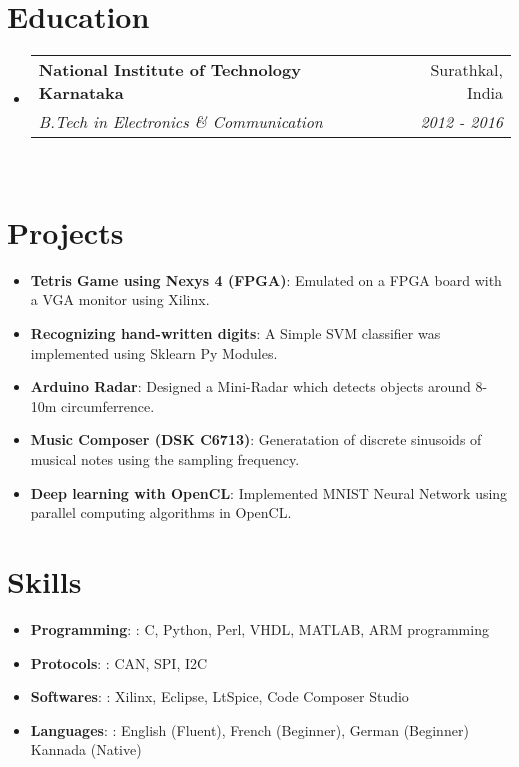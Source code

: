 \documentclass[letterpaper,11pt]{article}
\makeatletter
\newcommand{\resumeItem}[2]{
  \item\small{
    \textbf{#1}{: #2 \vspace{-2pt}}
  }
}
\newcommand{\resumeSubheading}[4]{
  \vspace{-1pt}\item
    \begin{tabular*}{0.97\textwidth}{l@{\extracolsep{\fill}}r}
      \textbf{#1} & #2 \\
      \textit{\small#3} & \textit{\small #4} \\
    \end{tabular*}\vspace{-5pt}
}
\newcommand{\resumeSubItem}[2]{\resumeItem{#1}{#2}\vspace{-4pt}}
\newcommand{\resumeSubHeadingListStart}{\begin{itemize}[leftmargin=*]}
\newcommand{\resumeSubHeadingListEnd}{\end{itemize}}
\makeatother
\begin{document}
\section{Education}
  \resumeSubHeadingListStart
    \resumeSubheading
      {National Institute of Technology Karnataka}{Surathkal, India}
      {B.Tech in Electronics \& Communication}{2012 - 2016}\\ \vspace{5pt}
    \iffalse
    \resumeSubheading
      {Vidya Mandir P.U College}{Bangalore, India}
      {12th, PCMB}{2010 - 2012}
	\resumeSubheading
	  {M.E.S. Kishore Kendra}{Bangalore, India}
	  {10$^{th}$, High School}{2007 - 2010}
	\fi  
  \resumeSubHeadingListEnd

\section{Projects}
  \resumeSubHeadingListStart
  \resumeSubItem{Tetris Game using Nexys 4 (FPGA)}
      {Emulated on a FPGA board with a VGA monitor using Xilinx.}
  \resumeSubItem{Recognizing hand-written digits}
	  {A Simple SVM classifier was implemented using Sklearn Py Modules.}
  \resumeSubItem{Arduino Radar}{Designed a Mini-Radar which detects objects around 8-10m circumferrence.}
  \resumeSubItem{Music Composer (DSK C6713)}
  {Generatation of discrete sinusoids of musical notes using the sampling frequency.}
  \resumeSubItem{Deep learning with OpenCL}
  {Implemented MNIST Neural Network using parallel computing algorithms in OpenCL.}
  \resumeSubHeadingListEnd

\section{Skills}
  \resumeSubHeadingListStart
      \resumeSubItem{Programming}{: C, Python, Perl, VHDL, MATLAB, ARM programming}
      \resumeSubItem{Protocols}{:  CAN, SPI, I2C}
      \resumeSubItem{Softwares}{:  Xilinx, Eclipse, LtSpice, Code Composer Studio}
      \resumeSubItem{Languages}{:  English (Fluent), French (Beginner), German (Beginner) Kannada (Native)}
  \resumeSubHeadingListEnd

\end{document}

